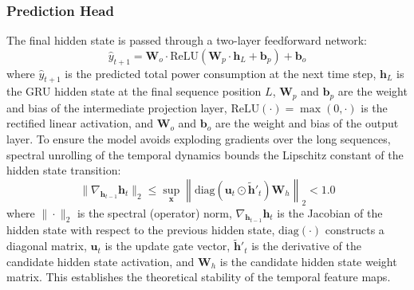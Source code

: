 \documentclass[journal]{IEEEtran}
\begin{document}
\subsubsection{Prediction Head} The final hidden state is passed through a two-layer feedforward network:
\begin{equation}
    \hat{y}_{t+1} = \mathbf{W}_o \cdot \text{ReLU}(\mathbf{W}_p \cdot \mathbf{h}_L + \mathbf{b}_p) + \mathbf{b}_o
    \label{eq:prediction}
\end{equation}
where $\hat{y}_{t+1}$ is the predicted total power consumption at the next time step, $\mathbf{h}_L$ is the GRU hidden state at the final sequence position $L$, $\mathbf{W}_p$ and $\mathbf{b}_p$ are the weight and bias of the intermediate projection layer, $\text{ReLU}(\cdot) = \max(0, \cdot)$ is the rectified linear activation, and $\mathbf{W}_o$ and $\mathbf{b}_o$ are the weight and bias of the output layer. To ensure the model avoids exploding gradients over the long sequences, spectral unrolling of the temporal dynamics bounds the Lipschitz constant of the hidden state transition:
\begin{equation}
    \|\nabla_{\mathbf{h}_{t-1}} \mathbf{h}_t\|_2 \leq \sup_{\mathbf{x}} \left\| \text{diag}(\mathbf{u}_t \odot \tilde{\mathbf{h}}'_t) \mathbf{W}_h \right\|_2 < 1.0
    \label{eq:gru_lipschitz}
\end{equation}
where $\|\cdot\|_2$ is the spectral (operator) norm, $\nabla_{\mathbf{h}_{t-1}} \mathbf{h}_t$ is the Jacobian of the hidden state with respect to the previous hidden state, $\text{diag}(\cdot)$ constructs a diagonal matrix, $\mathbf{u}_t$ is the update gate vector, $\tilde{\mathbf{h}}'_t$ is the derivative of the candidate hidden state activation, and $\mathbf{W}_h$ is the candidate hidden state weight matrix. This establishes the theoretical stability of the temporal feature maps.
\end{document}
